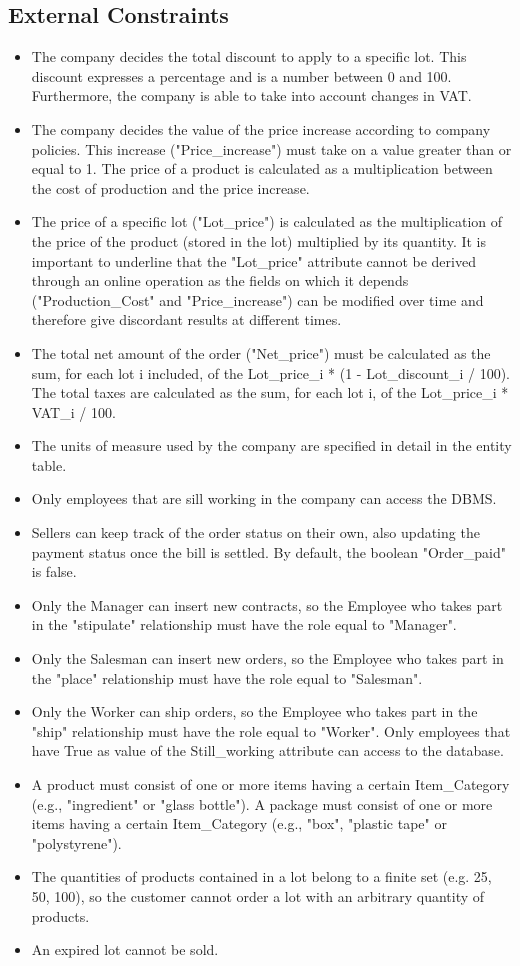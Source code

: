 \subsection{External Constraints}
\begin{itemize}
\item The company decides the total discount to apply to a specific lot. This discount expresses a percentage and is a number between 0 and 100. Furthermore, the company is able to take into account changes in VAT.
\item The company decides the value of the price increase according to company policies. This increase ("Price\_increase") must take on a value greater than or equal to 1. The price of a product is calculated as a multiplication between the cost of production and the price increase.
\item The price of a specific lot ("Lot\_price") is calculated as the multiplication of the price of the product (stored in the lot) multiplied by its quantity. It is important to underline that the "Lot\_price" attribute cannot be derived through an online operation as the fields on which it depends ("Production\_Cost" and "Price\_increase") can be modified over time and therefore give discordant results at different times.
\item The total net amount of the order ("Net\_price") must be calculated as the sum, for each lot i included, of the Lot\_price\_i * (1 - Lot\_discount\_i / 100). The total taxes are calculated as the sum, for each lot i, of the Lot\_price\_i * VAT\_i / 100.
\item The units of measure used by the company are specified in detail in the entity table.
\item Only employees that are sill working in the company can access the DBMS.
\item Sellers can keep track of the order status on their own, also updating the payment status once the bill is settled. By default, the boolean "Order\_paid" is false. 
\item Only the Manager can insert new contracts, so the Employee who takes part in the "stipulate" relationship must have the role equal to "Manager". 
\item Only the Salesman can insert new orders, so the Employee who takes part in the "place" relationship must have the role equal to "Salesman". 
\item Only the Worker can ship orders, so the Employee who takes part in the "ship" relationship must have the role equal to "Worker".
\itemm Only employees that have True as value of the Still_working attribute can access to the database.
\item A product must consist of one or more items having a certain Item\_Category (e.g., "ingredient" or "glass bottle"). A package must consist of one or more items having a certain Item\_Category (e.g., "box", "plastic tape" or "polystyrene"). 
\item The quantities of products contained in a lot belong to a finite set (e.g. 25, 50, 100), so the customer cannot order a lot with an arbitrary quantity of products.
\item An expired lot cannot be sold.
\end{itemize}
